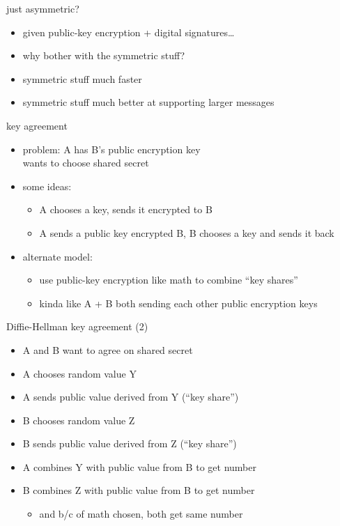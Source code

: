 \begin{frame}{just asymmetric?}
    \begin{itemize}
    \item given public-key encryption + digital signatures\ldots
    \item why bother with the symmetric stuff?
    \vspace{.5cm}
    \item symmetric stuff much faster
    \item symmetric stuff much better at supporting larger messages
    \end{itemize}
\end{frame}

\begin{frame}{key agreement}
    \begin{itemize}
    \item problem: A has B's public encryption key \\
        wants to choose shared secret 
    \vspace{.5cm}
    \item some ideas:
        \begin{itemize}
        \item A chooses a key, sends it encrypted to B
        \item A sends a public key encrypted B, B chooses a key and sends it back
        \end{itemize}
    \item alternate model:
        \begin{itemize}
        \item use public-key encryption like math to combine ``key shares''
        \item kinda like A + B both sending each other public encryption keys
        \end{itemize}
    \end{itemize}
\end{frame}

\begin{frame}{Diffie-Hellman key agreement (2)}
\begin{itemize}
\item A and B want to agree on shared secret
\vspace{.5cm}
\item A chooses random value Y
\item A sends public value derived from Y (``key share'')
\item B chooses random value Z
\item B sends public value derived from Z (``key share'')
\item A combines Y with public value from B to get number
\item B combines Z with public value from B to get number
    \begin{itemize}
    \item and b/c of math chosen, both get same number
    \end{itemize}
\end{itemize}
\end{frame}

